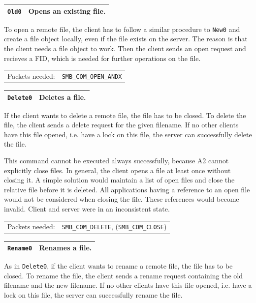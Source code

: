 \documentclass[11pt,a4paper]{book}
\begin{document}
\begin{center}
\renewcommand{\tabcolsep}{5mm}
\begin{tabular}{p{3cm}p{8cm}}
\texttt{Old0} & \textbf{Opens an existing file.} \\ 
\hline
\end{tabular}
\end{center}
To open a remote file, the client has to follow a similar procedure to \texttt{New0} and create a file object locally, even if the file exists on the server. The reason is that the client needs a file object to work. Then the client sends an open request and recieves a FID, which is needed for further operations on the file. \\
\renewcommand{\tabcolsep}{5mm}
\begin{tabular}{p{3cm}p{8cm}}
Packets needed: & \texttt{SMB\_COM\_OPEN\_ANDX} \\
\end{tabular}

\begin{center}
\renewcommand{\tabcolsep}{5mm}
\begin{tabular}{p{3cm}p{8cm}}
\texttt{Delete0} & \textbf{Deletes a file.} \\ 
\hline
\end{tabular}
\end{center}
If the client wants to delete a remote file, the file has to be closed. To delete the file, the client sends a delete request for the given filename. If no other clients have this file opened, i.e. have a lock on this file, the server can successfully delete the file.

This command cannot be executed always successfully, because A2 cannot explicitly close files. In general, the client opens a file at least once without closing it. A simple solution would maintain a list of open files and close the relative file before it is deleted. All applications having a reference to an open file would not be considered when closing the file. These references would become invalid. Client and server were in an inconsistent state. \\
\renewcommand{\tabcolsep}{5mm}
\begin{tabular}{p{3cm}p{8cm}}
Packets needed: & \texttt{SMB\_COM\_DELETE}, (\texttt{SMB\_COM\_CLOSE}) \\
\end{tabular}

\begin{center}
\renewcommand{\tabcolsep}{5mm}
\begin{tabular}{p{3cm}p{8cm}}
\texttt{Rename0} & \textbf{Renames a file.} \\ 
\hline
\end{tabular}
\end{center}
As in \texttt{Delete0}, if the client wants to rename a remote file, the file has to be closed. To rename the file, the client sends a rename request containing the old filename and the new filename. If no other clients have this file opened, i.e. have a lock on this file, the server can successfully rename the file.
\end{document}
